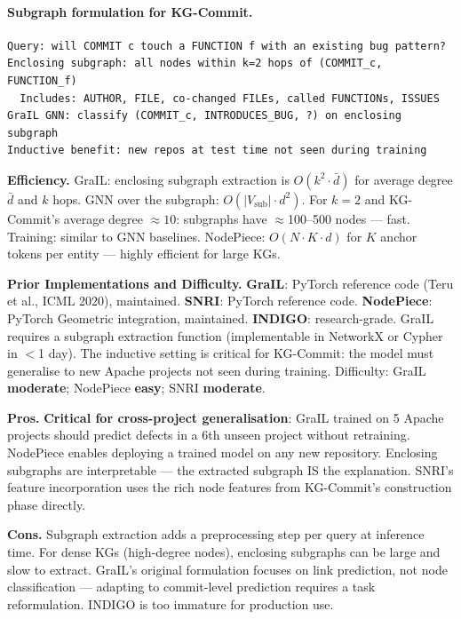 \documentclass[12pt,a4paper]{article}
\begin{document}
\paragraph{Subgraph formulation for KG-Commit.}
\begin{lstlisting}
Query: will COMMIT c touch a FUNCTION f with an existing bug pattern?
Enclosing subgraph: all nodes within k=2 hops of (COMMIT_c, FUNCTION_f)
  Includes: AUTHOR, FILE, co-changed FILEs, called FUNCTIONs, ISSUES
GraIL GNN: classify (COMMIT_c, INTRODUCES_BUG, ?) on enclosing subgraph
Inductive benefit: new repos at test time not seen during training
\end{lstlisting}

\begin{effbox}
\textbf{Efficiency.}
GraIL: enclosing subgraph extraction is $O(k^2 \cdot \bar{d})$ for average
degree $\bar{d}$ and $k$ hops. GNN over the subgraph: $O(|V_\text{sub}|
\cdot d^2)$. For $k=2$ and KG-Commit's average degree $\approx 10$: subgraphs
have $\approx$100--500 nodes --- fast. Training: similar to GNN baselines.
NodePiece: $O(N \cdot K \cdot d)$ for $K$ anchor tokens per entity --- highly
efficient for large KGs.
\end{effbox}

\begin{implbox}
\textbf{Prior Implementations and Difficulty.}
\textbf{GraIL}: PyTorch reference code (Teru et al., ICML 2020), maintained.
\textbf{SNRI}: PyTorch reference code.
\textbf{NodePiece}: PyTorch Geometric integration, maintained.
\textbf{INDIGO}: research-grade.
GraIL requires a subgraph extraction function (implementable in NetworkX or
Cypher in $<$1 day). The inductive setting is critical for KG-Commit: the
model must generalise to new Apache projects not seen during training.
Difficulty: GraIL \textbf{moderate}; NodePiece \textbf{easy}; SNRI
\textbf{moderate}.
\end{implbox}

\begin{prosbox}
\textbf{Pros.}
\textbf{Critical for cross-project generalisation}: GraIL trained on 5 Apache
projects should predict defects in a 6th unseen project without retraining.
NodePiece enables deploying a trained model on any new repository. Enclosing
subgraphs are interpretable --- the extracted subgraph IS the explanation.
SNRI's feature incorporation uses the rich node features from KG-Commit's
construction phase directly.
\end{prosbox}

\begin{consbox}
\textbf{Cons.}
Subgraph extraction adds a preprocessing step per query at inference time.
For dense KGs (high-degree nodes), enclosing subgraphs can be large and
slow to extract. GraIL's original formulation focuses on link prediction,
not node classification --- adapting to commit-level prediction requires
a task reformulation. INDIGO is too immature for production use.
\end{consbox}
\end{document}
